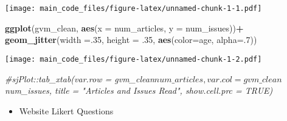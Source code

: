 \documentclass[
]{article}
\newenvironment{Shaded}{\begin{snugshade}}{\end{snugshade}}
\newcommand{\AttributeTok}[1]{\textcolor[rgb]{0.13,0.29,0.53}{#1}}
\newcommand{\CommentTok}[1]{\textcolor[rgb]{0.56,0.35,0.01}{\textit{#1}}}
\newcommand{\DecValTok}[1]{\textcolor[rgb]{0.00,0.00,0.81}{#1}}
\newcommand{\FunctionTok}[1]{\textcolor[rgb]{0.13,0.29,0.53}{\textbf{#1}}}
\newcommand{\NormalTok}[1]{#1}
\newcommand{\SpecialCharTok}[1]{\textcolor[rgb]{0.81,0.36,0.00}{\textbf{#1}}}
\providecommand{\tightlist}{%
  \setlength{\itemsep}{0pt}\setlength{\parskip}{0pt}}
\begin{document}
\texttt{[image: main\_code\_files/figure-latex/unnamed-chunk-1-1.pdf]}

\begin{Shaded}
\begin{Highlighting}[]
\FunctionTok{ggplot}\NormalTok{(gvm\_clean, }\FunctionTok{aes}\NormalTok{(}\AttributeTok{x =}\NormalTok{ num\_articles, }\AttributeTok{y =}\NormalTok{ num\_issues))}\SpecialCharTok{+}
  \FunctionTok{geom\_jitter}\NormalTok{(}\AttributeTok{width =}\NormalTok{.}\DecValTok{35}\NormalTok{, }\AttributeTok{height =}\NormalTok{ .}\DecValTok{35}\NormalTok{, }\FunctionTok{aes}\NormalTok{(}\AttributeTok{color=}\NormalTok{age, }\AttributeTok{alpha=}\NormalTok{.}\DecValTok{7}\NormalTok{))}
\end{Highlighting}
\end{Shaded}

\texttt{[image: main\_code\_files/figure-latex/unnamed-chunk-1-2.pdf]}

\begin{Shaded}
\begin{Highlighting}[]
\CommentTok{\#sjPlot::tab\_xtab(var.row = gvm\_clean$num\_articles, var.col = gvm\_clean$num\_issues, title = "Articles and Issues Read", show.cell.prc = TRUE)}
\end{Highlighting}
\end{Shaded}

\begin{itemize}
\tightlist
\item
  Website Likert Questions
\end{itemize}
\end{document}
